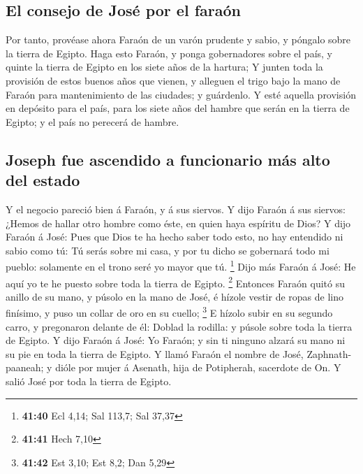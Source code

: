 \hypertarget{el-consejo-de-josuxe9-por-el-farauxf3n}{%
\subsection{El consejo de José por el
faraón}\label{el-consejo-de-josuxe9-por-el-farauxf3n}}

 Por tanto, provéase ahora Faraón de un varón prudente y
sabio, y póngalo sobre la tierra de Egipto.  Haga esto
Faraón, y ponga gobernadores sobre el país, y quinte la tierra de Egipto
en los siete años de la hartura;  Y junten toda la
provisión de estos buenos años que vienen, y alleguen el trigo bajo la
mano de Faraón para mantenimiento de las ciudades; y guárdenlo.
 Y esté aquella provisión en depósito para el país, para
los siete años del hambre que serán en la tierra de Egipto; y el país no
perecerá de hambre.

\hypertarget{joseph-fue-ascendido-a-funcionario-muxe1s-alto-del-estado}{%
\subsection{Joseph fue ascendido a funcionario más alto del
estado}\label{joseph-fue-ascendido-a-funcionario-muxe1s-alto-del-estado}}

 Y el negocio pareció bien á Faraón, y á sus siervos.
 Y dijo Faraón á sus siervos: ¿Hemos de hallar otro
hombre como éste, en quien haya espíritu de Dios?  Y dijo
Faraón á José: Pues que Dios te ha hecho saber todo esto, no hay
entendido ni sabio como tú:  Tú serás sobre mi casa, y
por tu dicho se gobernará todo mi pueblo: solamente en el trono seré yo
mayor que tú. \footnote{\textbf{41:40} Ecl 4,14; Sal 113,7; Sal 37,37}
 Dijo más Faraón á José: He aquí yo te he puesto sobre
toda la tierra de Egipto. \footnote{\textbf{41:41} Hech 7,10}
 Entonces Faraón quitó su anillo de su mano, y púsolo en
la mano de José, é hízole vestir de ropas de lino finísimo, y puso un
collar de oro en su cuello; \footnote{\textbf{41:42} Est 3,10; Est 8,2;
  Dan 5,29}  E hízolo subir en su segundo carro, y
pregonaron delante de él: Doblad la rodilla: y púsole sobre toda la
tierra de Egipto.  Y dijo Faraón á José: Yo Faraón; y sin
ti ninguno alzará su mano ni su pie en toda la tierra de Egipto.
 Y llamó Faraón el nombre de José, Zaphnath-paaneah; y
dióle por mujer á Asenath, hija de Potipherah, sacerdote de On. Y salió
José por toda la tierra de Egipto.

